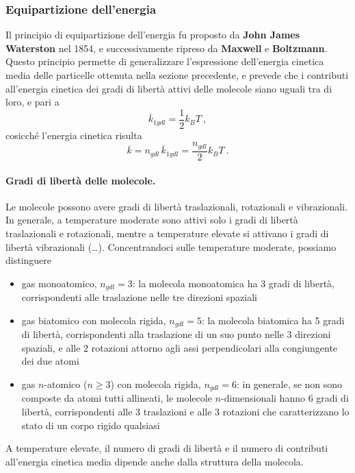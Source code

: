 \subsubsection{Equipartizione dell'energia}
Il principio di equipartizione dell'energia fu proposto da \textbf{John James Waterston} nel 1854, e successivamente ripreso da \textbf{Maxwell} e \textbf{Boltzmann}. Questo principio permette di generalizzare l'espressione dell'energia cinetica media delle particelle ottenuta nella sezione precedente, e prevede che i contributi all'energia cinetica dei gradi di libertà attivi delle molecole siano uguali tra di loro, e pari a 
\begin{equation}
    \overline{k}_{1 gdl} = \dfrac{1}{2} k_B T \ ,
\end{equation}
cosicché l'energia cinetica risulta
\begin{equation}
    \overline{k} = n_{gdl} \, \overline{k}_{1 gdl} = \dfrac{n_{gdl}}{2} k_B T \ .
\end{equation}

\paragraph{Gradi di libertà delle molecole.}
Le molecole possono avere gradi di libertà traslazionali, rotazionali e vibrazionali. In generale, a temperature moderate sono attivi solo i gradi di libertà traslazionali e rotazionali, mentre a temperature elevate si attivano i gradi di libertà vibrazionali {\color{red} (\dots)}. Concentrandoci sulle temperature moderate, possiamo distinguere
\begin{itemize}
    \item gas monoatomico, $n_{gdl} = 3$: la molecola monoatomica ha 3 gradi di libertà, corrispondenti alle traslazione nelle tre direzioni spaziali
    \item gas biatomico con molecola rigida, $n_{gdl} = 5$: la molecola biatomica ha 5 gradi di libertà, corrispondenti alla traslazione di un suo punto nelle 3 direzioni spaziali, e alle 2 rotazioni attorno agli assi perpendicolari alla congiungente dei due atomi
    \item gas $n$-atomico ($n \ge 3$) con molecola rigida, $n_{gdl} = 6$: in generale, se non sono composte da atomi tutti allineati, le molecole $n$-dimensionali hanno 6 gradi di libertà, corrispondenti alle 3 traslazioni e alle 3 rotazioni che caratterizzano lo stato di un corpo rigido qualsiasi
\end{itemize}
{\color{red} A temperature elevate, il numero di gradi di libertà e il numero di contributi all'energia cinetica media dipende anche dalla struttura della molecola.}

